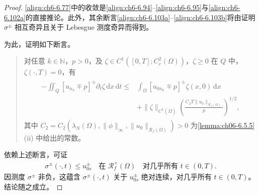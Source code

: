 \documentclass[../../main.tex]{subfiles}%
\begin{document}
\begin{proof}
\eqref{align:ch6-6.77}中的收敛是\eqref{align:ch6-6.94}--\eqref{align:ch6-6.95}与\eqref{align:ch6-6.102a}的直接推论。此外，其余断言\eqref{align:ch6-6.103a}--\eqref{align:ch6-6.103b}将由证明 $\sigma^\pm$ 相互奇异且关于 Lebesgue 测度奇异而得到。

为此，证明如下断言。

\begin{quote}
对任意 $k\in\mathbb{N}$，$p>0$，及 $\zeta\in C^1([0,T];C^2_c(\Omega))$，$\zeta\geqslant0$ 在 $Q$ 中，$\zeta(\cdot,T)=0$，有
\begin{align}
\begin{aligned}
-\iint_Q[u_{n_k}\mp p]^\pm\partial_t\zeta\,\mathrm{d}x\,\mathrm{d}t
\leqslant{}&\int_\Omega[u_{0n_k}\mp p]^\pm\zeta(x,0)\,\mathrm{d}x\\
&+\|\zeta\|_{C^1(\overline\Omega)}\left(\frac{C_2T\|u_0\|_{\mathscr{R}_f(\Omega)}}{p}\right)^{1/2},
\end{aligned} \label{align:ch6-6.104}
\end{align}
其中 $C_2=C_2(\lambda_N(\Omega),\|\phi\|_\infty,\|u_0\|_{\mathscr{R}_f(\Omega)})>0$ 为\cref{lemma:ch06-6.5.5}(ii) 中给出的常数。
\end{quote}

依赖上述断言，可证
\begin{align}
\sigma^\pm(\cdot,t)\leqslant u^\pm_{0s} \quad\text{在 }\mathscr{R}^+_f(\Omega)
\quad\text{对几乎所有 }t\in(0,T). \label{align:ch6-6.105}
\end{align}
因测度 $\sigma^\pm$ 非负，这蕴含 $\sigma^\pm(\cdot,t)$ 关于 $u^\pm_{0s}$ 绝对连续，对几乎所有 $t\in(0,T)$。结论随之成立。


\end{proof}
\end{document}
